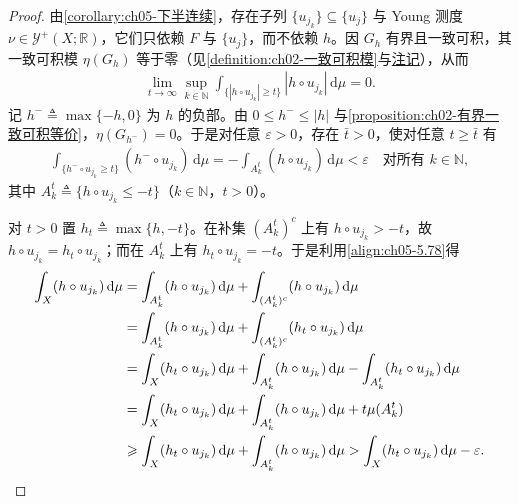 \documentclass[../../main.tex]{subfiles}
\begin{document}
\begin{proof}
由\cref{corollary:ch05-下半连续}，存在子列 $\{u_{j_k}\}\subseteq\{u_j\}$ 与 Young 测度 $\nu\in\mathcal{Y}^+(X;\mathbb{R})$，它们只依赖 $F$ 与 $\{u_j\}$，而不依赖 $h$。因 $G_h$ 有界且一致可积，其一致可积模 $\eta(G_h)$ 等于零（见\cref{definition:ch02-一致可积模}与\hyperref[remark:ch02-模零一致可积]{注记}），从而
\begin{align*}
\lim_{t\to\infty}\sup_{k\in\mathbb{N}}\int_{\{|h\circ u_{j_k}|\geqslant t\}}|h\circ u_{j_k}|\,\mathrm{d}\mu=0.
\end{align*}
记 $h^-\triangleq\max\{-h,0\}$ 为 $h$ 的负部。由 $0\leqslant h^-\leqslant|h|$ 与\cref{proposition:ch02-有界一致可积等价}，$\eta(G_{h^-})=0$。于是对任意 $\varepsilon>0$，存在 $\bar t>0$，使对任意 $t\geqslant\bar t$ 有
\begin{align}
\int_{\{h^-\circ u_{j_k}\geqslant t\}}(h^-\circ u_{j_k})\,\mathrm{d}\mu
=-\int_{A^t_k}(h\circ u_{j_k})\,\mathrm{d}\mu<\varepsilon
\quad\text{对所有 }k\in\mathbb{N},\label{align:ch05-5.78}
\end{align}
其中 $A^t_k\triangleq\{h\circ u_{j_k}\leqslant-t\}$（$k\in\mathbb{N}$，$t>0$）。

对 $t>0$ 置 $h_t\triangleq\max\{h,-t\}$。在补集 $(A^t_k)^c$ 上有 $h\circ u_{j_k}>-t$，故 $h\circ u_{j_k}=h_t\circ u_{j_k}$；而在 $A^t_k$ 上有 $h_t\circ u_{j_k}=-t$。于是利用\eqref{align:ch05-5.78}得
\begin{align}
\int_X(h\circ u_{j_k})\,\mathrm{d}\mu
&=\int_{A^t_k}(h\circ u_{j_k})\,\mathrm{d}\mu+\int_{(A^t_k)^c}(h\circ u_{j_k})\,\mathrm{d}\mu\notag\\
&=\int_{A^t_k}(h\circ u_{j_k})\,\mathrm{d}\mu+\int_{(A^t_k)^c}(h_t\circ u_{j_k})\,\mathrm{d}\mu\notag\\
&=\int_X(h_t\circ u_{j_k})\,\mathrm{d}\mu+\int_{A^t_k}(h\circ u_{j_k})\,\mathrm{d}\mu-\int_{A^t_k}(h_t\circ u_{j_k})\,\mathrm{d}\mu\notag\\
&=\int_X(h_t\circ u_{j_k})\,\mathrm{d}\mu+\int_{A^t_k}(h\circ u_{j_k})\,\mathrm{d}\mu+t\mu(A^t_k)\notag\\
&\geqslant\int_X(h_t\circ u_{j_k})\,\mathrm{d}\mu+\int_{A^t_k}(h\circ u_{j_k})\,\mathrm{d}\mu
>\int_X(h_t\circ u_{j_k})\,\mathrm{d}\mu-\varepsilon.\label{align:ch05-5.79}
\end{align}


\end{proof}
\end{document}
